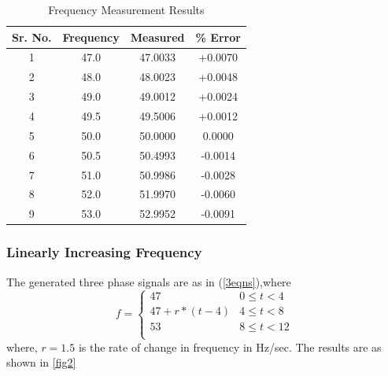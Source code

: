 
\begin{table}[!t]
\caption{Frequency Measurement Results} %
\centering %
\begin{tabular}{c c c c} %
\hline\hline                        %
Sr. No. & Frequency & Measured  & \% Error \\ [0.5ex] %
\hline %
1 & 47.0 & 47.0033 & +0.0070 \\ %
2 & 48.0 & 48.0023 & +0.0048 \\
3 & 49.0 & 49.0012  & +0.0024 \\
4 & 49.5 & 49.5006 & +0.0012 \\
5 & 50.0 & 50.0000 & 0.0000 \\
6 & 50.5 & 50.4993 & -0.0014 \\
7 & 51.0 & 50.9986 & -0.0028 \\
8 & 52.0 & 51.9970 & -0.0060 \\
9 & 53.0 & 52.9952 & -0.0091 \\ [1ex] %
\hline %
\end{tabular}
\label{table_error} %
\end{table}

\subsubsection{Linearly Increasing Frequency}
\label{linfreq}
The generated three phase signals are as in (\ref{3eqns}),where
\begin{equation}
\label{rate_eqn}
f = \left\{
\begin{array}{ll}
  47 &  0 \leq t < 4 \\
  47 + r*(t-4)  & {4 \leq t <8 }\\
  53 & {8 \leq t <12 }\\
\end{array} \right.
\end{equation}
where,
\newline$r=1.5$ is the rate of change in frequency in Hz/sec.
The results are as shown in \figurename\ref{fig2}

